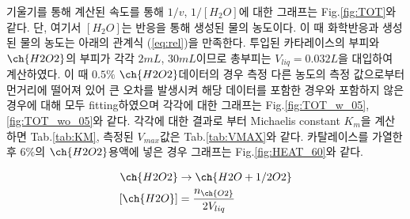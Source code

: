 \documentclass[%
 reprint,
 amsmath,amssymb,
 aps,
]{revtex4-2}
\begin{document}
기울기를 통해 계산된 속도를 통해 $1/v$, $1/[H_{2}O]$에 대한 그래프는 Fig.\ref{fig:TOT}와 같다. 단, 여기서 $[H_{2}O]$는 반응을 통해 생성된 물의 농도이다. 이 때 화학반응과 생성된 물의 농도는 아래의 관계식 (\ref{eq:rel})을 만족한다. 투입된 카타레이스의 부피와 $\ch{H2O2}$의 부피가 각각 $2mL$, $30mL$이므로 총부피는 $V_{liq}=0.032L$을 대입하여 계산하였다. 이 때 $0.5\%$ $\ch{H2O2}$데이터의 경우 측정 다른 농도의 측정 값으로부터 먼거리에 떨어져 있어 큰 오차를 발생시켜 해당 데이터를 포함한 경우와 포함하지 않은 경우에 대해 모두 fitting하였으며 각각에 대한 그래프는  Fig.\ref{fig:TOT_w_05}, \ref{fig:TOT_wo_05}와 같다. 각각에 대한 결과로 부터 Michaelis constant $K_{m}$을 계산하면 Tab.\ref{tab:KM}, 측정된 $V_{max}$값은 Tab.\ref{tab:VMAX}와 같다. 카탈레이스를 가열한 후 $6\%$의 $\ch{H2O2}$용액에 넣은 경우 그래프는 Fig.\ref{fig:HEAT_60}와 같다.

\begin{align}
	\ch{H2O2} &\rightarrow \ch{H2O + 1/2 O2}\\
	[\ch{H2O}] &= \frac{n_{\ch{O2}}}{2V_{liq}}\label{eq:rel}
\end{align}
\end{document}
